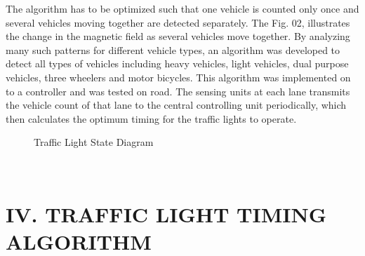 \documentclass{SureshLimkar}
\begin{document}
The algorithm has to be optimized such that one vehicle is counted only once and several vehicles moving together are detected separately. The Fig.  02, illustrates the change in the magnetic field as several vehicles move together. By analyzing many such patterns for different vehicle types,  an algorithm was developed to detect all types of vehicles including heavy vehicles, light vehicles, dual purpose vehicles, three wheelers and motor bicycles. This algorithm was implemented on to a controller and was tested on road.    
The sensing units at each lane transmits the vehicle count of that lane to the central controlling unit periodically, which then calculates the optimum timing for the traffic lights to operate. 
\begin{figure}[h]%
\centering
{}%
\caption{Traffic Light State Diagram}%
\label{Traffic Light State Diagram}%
\end{figure}

\\

\chapter{IV. TRAFFIC LIGHT TIMING ALGORITHM }
\end{document}
